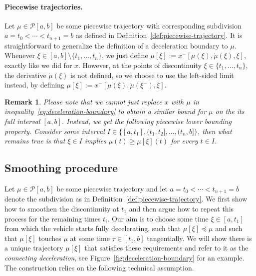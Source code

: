 \documentclass{report}
\theoremstyle{definition}
\theoremstyle{plain}
\newtheorem{remarknum}{Remark}[chapter]
\newcommand\openhalf[2]{\ensuremath{(#1,#2]}}
\begin{document}
\paragraph{Piecewise trajectories.}
Let $\mu \in \mathcal{P}[a, b]$ be some piecewise trajectory with corresponding
subdivision $a = t_{0} < \cdots < t_{n+1} = b$ as defined in Definition~\ref{def:piecewise-trajectory}. It is
straightforward to generalize the definition of a deceleration boundary to $\mu$.
%
Whenever $\xi \in [a,b] \setminus \{ t_{1}, \dots, t_{n}\}$, we just define
$\mu[\xi] := x^{-}[\mu(\xi), \dot{\mu}(\xi), \xi]$, exactly like we did for $x$.
%
However, at the points of discontinuity $\xi \in \{ t_{1}, \dots, t_{n}\}$, the
derivative $\dot{\mu}(\xi)$ is not defined, so we choose to use the left-sided limit
instead, by defining $\mu[\xi] := x^{-}[\mu(\xi), \dot{\mu}(\xi^{-}), \xi]$.

\begin{remarknum}\label{rem:lower-bound-piecewise}
  Please note that we cannot just replace $x$ with $\mu$ in inequality~\eqref{eq:deceleration-boundary} to
  obtain a similar bound for $\mu$ on the its full interval $[a,b]$.
  Instead, we get the following \emph{piecewise lower bounding} property.
  Consider some interval
  $I \in \{ [a, t_{1}], \openhalf{t_{1}}{t_{2}}, \dots, \openhalf{t_{n}}{b} \}$, then what
  remains true is that $\xi \in I$ implies $\mu(t) \geq \mu[\xi](t)$ for every $t \in I$.
\end{remarknum}


\subsection{Smoothing procedure}\label{sec:smoothing}
Let $\mu \in \mathcal{P}[a,b]$ be some piecewise trajectory and let
$a = t_{0} < \cdots < t_{n+1} = b$ denote the subdivision as in Definition~\ref{def:piecewise-trajectory}.
%
We first show how to smoothen the discontinuity at $t_{1}$ and then argue how to
repeat this process for the remaining times $t_{i}$.
Our aim is to choose some time $\xi \in [a,t_{1}]$ from which the vehicle starts
fully decelerating, such that $\mu[\xi] \preceq \mu$ and such that $\mu[\xi]$ touches $\mu$ at some time
$\tau \in [t_{1}, b]$ tangentially.
%
We will show there is a unique trajectory $\mu[\xi]$ that satisfies these requirements
and refer to it as the \emph{connecting deceleration}, see
Figure~\ref{fig:deceleration-boundary} for an example.
%
The construction relies on the following technical assumption.
\end{document}

